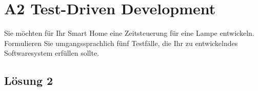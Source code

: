 \documentclass[main.tex]{subfiles}
\begin{document}
\section{A2 Test-Driven Development}
Sie möchten für Ihr Smart Home eine Zeitsteuerung für eine Lampe entwickeln. Formulieren Sie
umgangssprachlich fünf Testfälle, die Ihr zu entwickelndes Softwaresystem erfüllen sollte.

\subsection{Lösung 2}
\end{document}

